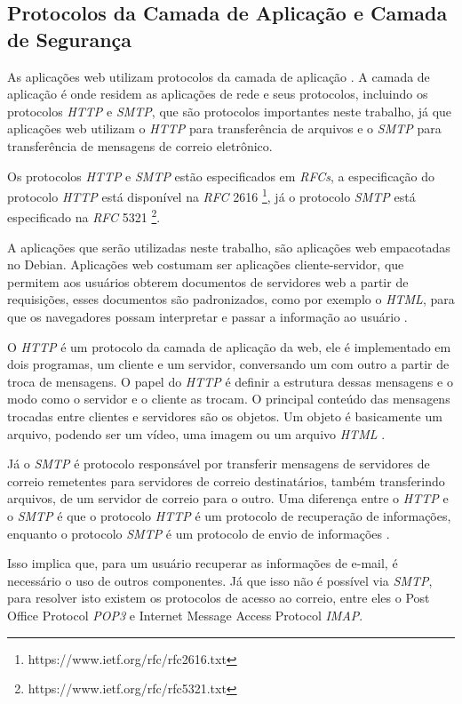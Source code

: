 \subsection{Protocolos da Camada de Aplicação e Camada de Segurança}

As aplicações web utilizam protocolos da camada de aplicação \cite{kurose2010redes}. 
A camada de aplicação é onde residem as 
aplicações de rede e seus protocolos, incluindo os protocolos \textit{HTTP} e 
\textit{SMTP}, que são protocolos importantes neste trabalho, já que 
aplicações web utilizam o \textit{HTTP} para transferência de arquivos e o \textit{SMTP} para
transferência de mensagens de correio eletrônico. 

Os protocolos \textit{HTTP} e \textit{SMTP} estão especificados em \textit{RFCs}, a 
especificação do protocolo \textit{HTTP} está disponível na \textit{RFC} 2616 
\footnote{https://www.ietf.org/rfc/rfc2616.txt}, já o protocolo \textit{SMTP} 
está especificado na \textit{RFC} 5321 \footnote{https://www.ietf.org/rfc/rfc5321.txt}.

A aplicações que serão utilizadas neste trabalho, são aplicações web empacotadas no
Debian. Aplicações web costumam ser aplicações cliente-servidor, que permitem aos
usuários obterem documentos de servidores web a partir de requisições, 
esses documentos são padronizados, como por exemplo o \textit{HTML}, 
para que os navegadores possam interpretar e passar a informação ao usuário 
\cite{kurose2010redes}.

O \textit{HTTP} é um protocolo da camada de aplicação da web, ele é 
implementado em dois programas, um cliente e um servidor, conversando um 
com outro a partir de troca de mensagens. O papel do \textit{HTTP} é definir a 
estrutura dessas mensagens e o modo como o servidor e o cliente as trocam. O 
principal conteúdo das mensagens trocadas entre clientes e servidores são os 
objetos. Um objeto é basicamente um arquivo, podendo ser um vídeo, uma imagem 
ou um arquivo \textit{HTML} \cite{kurose2010redes}.

Já o \textit{SMTP} é protocolo responsável por transferir mensagens de servidores de correio
remetentes para servidores de correio destinatários, também transferindo arquivos,
de um servidor de correio para o outro. Uma diferença entre o \textit{HTTP} e o \textit{SMTP}
é que o protocolo \textit{HTTP} é um protocolo de recuperação de informações, enquanto
o protocolo \textit{SMTP} é um protocolo de envio de informações \cite{kurose2010redes}. 

Isso implica que, para um usuário recuperar as informações de e-mail, é necessário 
o uso de outros componentes. Já que isso não é possível via \textit{SMTP}, para 
resolver isto existem os protocolos de acesso ao correio, entre eles o 
Post Office Protocol \textit{POP3} e Internet Message Access Protocol \textit{IMAP}.

